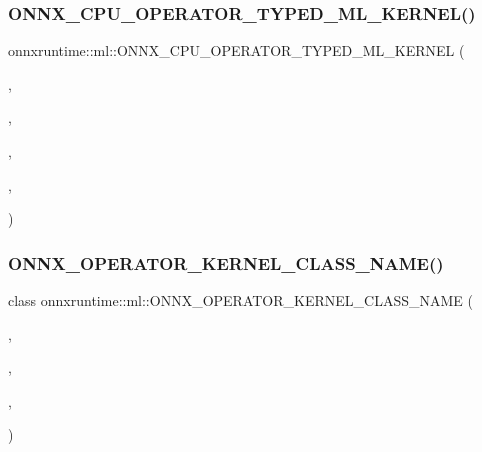 \subsubsection{\texorpdfstring{O\+N\+N\+X\+\_\+\+C\+P\+U\+\_\+\+O\+P\+E\+R\+A\+T\+O\+R\+\_\+\+T\+Y\+P\+E\+D\+\_\+\+M\+L\+\_\+\+K\+E\+R\+N\+E\+L()}{ONNX\_CPU\_OPERATOR\_TYPED\_ML\_KERNEL()}\hspace{0.1cm}{\footnotesize\ttfamily [8/8]}}
{\footnotesize\ttfamily onnxruntime\+::ml\+::\+O\+N\+N\+X\+\_\+\+C\+P\+U\+\_\+\+O\+P\+E\+R\+A\+T\+O\+R\+\_\+\+T\+Y\+P\+E\+D\+\_\+\+M\+L\+\_\+\+K\+E\+R\+N\+EL (\begin{DoxyParamCaption}\item[{Scaler}]{,  }\item[{1}]{,  }\item[{int32\+\_\+t}]{,  }\item[{\mbox{\hyperlink{classonnxruntime_1_1KernelDefBuilder}{Kernel\+Def\+Builder}}().Type\+Constraint(\char`\"{}T\char`\"{}, Data\+Type\+Impl\+::\+Get\+Tensor\+Type$<$ int32\+\_\+t $>$()).May\+Inplace(0, 0)}]{,  }\item[{\mbox{\hyperlink{classonnxruntime_1_1ml_1_1ScalerOp}{Scaler\+Op}}$<$ int32\+\_\+t $>$}]{ }\end{DoxyParamCaption})}

\mbox{\label{namespaceonnxruntime_1_1ml_ab478b918b30f75237fe75262f5846436}} 
\subsubsection{\texorpdfstring{O\+N\+N\+X\+\_\+\+O\+P\+E\+R\+A\+T\+O\+R\+\_\+\+K\+E\+R\+N\+E\+L\+\_\+\+C\+L\+A\+S\+S\+\_\+\+N\+A\+M\+E()}{ONNX\_OPERATOR\_KERNEL\_CLASS\_NAME()}\hspace{0.1cm}{\footnotesize\ttfamily [1/11]}}
{\footnotesize\ttfamily class onnxruntime\+::ml\+::\+O\+N\+N\+X\+\_\+\+O\+P\+E\+R\+A\+T\+O\+R\+\_\+\+K\+E\+R\+N\+E\+L\+\_\+\+C\+L\+A\+S\+S\+\_\+\+N\+A\+ME (\begin{DoxyParamCaption}\item[{\mbox{\hyperlink{namespaceonnxruntime_a394a3c7e50622de1f203a96df592060d}{k\+Cpu\+Execution\+Provider}}}]{,  }\item[{\mbox{\hyperlink{namespaceonnxruntime_a76df7dd63759039fc62486d6691e70e5}{k\+M\+L\+Domain}}}]{,  }\item[{1}]{,  }\item[{\mbox{\hyperlink{classonnxruntime_1_1ml_1_1FeatureVectorizer}{Feature\+Vectorizer}}}]{ }\end{DoxyParamCaption})}

